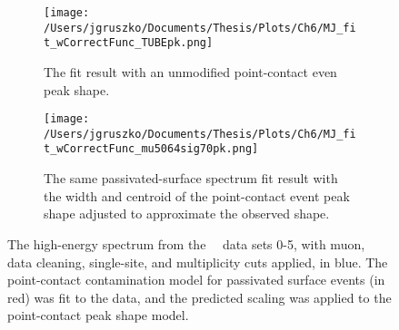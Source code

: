 \begin{figure}[]
 \centering
 \begin{subfigure}[]{\textwidth}
 \centering
 \texttt{[image: /Users/jgruszko/Documents/Thesis/Plots/Ch6/MJ\_fit\_wCorrectFunc\_TUBEpk.png]}
 \caption{The fit result with an unmodified point-contact even peak shape.}
 \label{fig:r2spec_orig}
  \end{subfigure}
 \begin{subfigure}[]{\textwidth}
 \centering
 \texttt{[image: /Users/jgruszko/Documents/Thesis/Plots/Ch6/MJ\_fit\_wCorrectFunc\_mu5064sig70pk.png]}
  \caption{The same passivated-surface spectrum fit result with the width and centroid of the point-contact event peak shape adjusted to approximate the observed shape.}
 \label{fig:r2spec_mod}
 \end{subfigure}
 \caption[A fit of the point contact contamination model to the \MJ\ \DEM\ energy spectrum]{The high-energy spectrum from the \MJ\ \DEM\, data sets 0-5, with muon, data cleaning, single-site, and multiplicity cuts applied, in blue. The point-contact contamination model for passivated surface events (in red) was fit to the data, and the predicted scaling was applied to the point-contact peak shape model.} 
 \label{fig:mjSpec_fit}
\end{figure}


